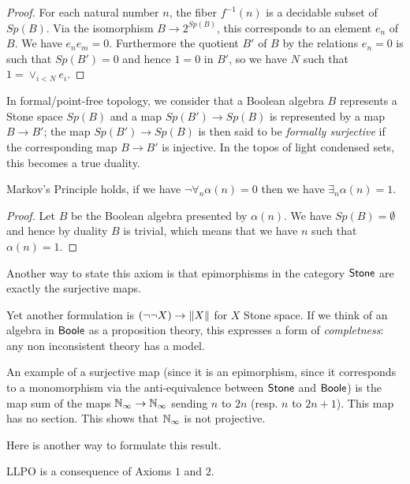 \begin{proof}
  For each natural number $n$, the fiber $f^{-1}(n)$ is a decidable
  subset of $Sp(B)$. Via the isomorphism $B\rightarrow 2^{Sp(B)}$, this corresponds to an element $e_n$ of $B$. We have
  $e_ne_m = 0$. Furthermore the quotient $B'$ of $B$ by the relations $e_n = 0$ is such that $Sp(B') = 0$ and hence
  $1 = 0$ in $B'$, so we have $N$ such that $1 = \vee_{i<N}e_i$.
\end{proof}

\medskip

In formal/point-free topology, we consider that a Boolean algebra $B$ represents a Stone space $Sp(B)$ and a map
$Sp(B') \to Sp(B)$ is represented by a map $B\rightarrow B'$; the map $Sp(B')\to Sp(B)$ is then said to be
{\em formally surjective} if the corresponding map $B\to B'$ is injective. In the topos of light condensed sets,
this becomes a true duality.

\begin{proposition}\label{PropMarkov}
Markov's Principle holds, if we have $\neg \forall_n\alpha(n) = 0$ then we have $\exists_n \alpha(n) = 1$.
\end{proposition}

\begin{proof}
  Let $B$ be the Boolean algebra presented by $\alpha(n)$. We have $Sp(B) = \emptyset$ and hence by duality
  $B$ is trivial, which means that we have $n$ such that $\alpha(n) = 1$.
\end{proof}


Another way to state this axiom is that epimorphisms in the category $\mathsf{Stone}$ are exactly the surjective maps.

Yet another formulation is $(\neg \neg X)\rightarrow \lVert X \rVert$ for $X$ Stone space. If we think of an algebra
in $\mathsf{Boole}$ as a proposition theory, this expresses a form of {\em completness}: any non inconsistent theory has
a model. 

\medskip

An example of a surjective map (since it is an epimorphism, since it corresponds to a monomorphism via the anti-equivalence
between $\mathsf{Stone}$ and $\mathsf{Boole}$) is the map sum of the maps $\mathbb{N}_{\infty}\rightarrow \mathbb{N}_{\infty}$ sending $n$ to $2n$ (resp. $n$ to $2n+1$).
This map has no section. This shows that $\mathbb{N}_{\infty}$ is not projective.

Here is another way to formulate this result.

\begin{proposition}
  LLPO is a consequence of Axioms $1$ and $2$.
\end{proposition}


